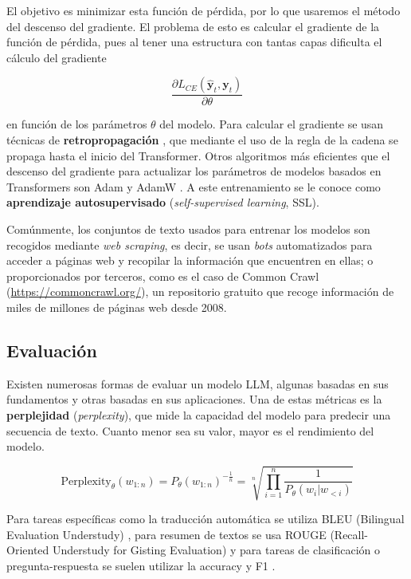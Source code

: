 \documentclass[12pt,twoside]{article}
\begin{document}
El objetivo es minimizar esta función de pérdida, por lo que usaremos el método del descenso del gradiente. El problema de esto es calcular el gradiente de la función de pérdida, pues al tener una estructura con tantas capas dificulta el cálculo del gradiente

\begin{equation}
    \frac{\partial L_{CE}(\hat{\mathbf{y}}_t,\mathbf{y}_t)}{\partial \theta}
\end{equation}

en función de los parámetros $\theta$ del modelo. Para calcular el gradiente se usan técnicas de \textbf{retropropagación} \cite{retropropagación}, que mediante el uso de la regla de la cadena se propaga hasta el inicio del Transformer. Otros algoritmos más eficientes que el descenso del gradiente para actualizar los parámetros de modelos basados en Transformers son Adam \cite{Adam} y AdamW \cite{AdamW}. A este entrenamiento se le conoce como \textbf{aprendizaje autosupervisado} (\textit{self-supervised learning}, SSL).

Comúnmente, los conjuntos de texto usados para entrenar los modelos son recogidos mediante \textit{web scraping}, es decir, se usan \textit{bots} automatizados para acceder a páginas web y recopilar la información que encuentren en ellas; o proporcionados por terceros, como es el caso de Common Crawl (\url{https://commoncrawl.org/}), un repositorio gratuito que recoge información de miles de millones de páginas web desde 2008.

\subsection{Evaluación}
Existen numerosas formas de evaluar un modelo LLM, algunas basadas en sus fundamentos y otras basadas en sus aplicaciones. Una de estas métricas es la \textbf{perplejidad} (\textit{perplexity}), que mide la capacidad del modelo para predecir una secuencia de texto. Cuanto menor sea su valor, mayor es el rendimiento del modelo.

\begin{equation}
    \text{Perplexity}_\theta(w_{1:n})=P_\theta(w_{1:n})^{-\frac{1}{n}}=\sqrt[n]{\prod_{i=1}^n\frac{1}{P_\theta(w_{i}|w_{<i})}}
\end{equation}

Para tareas específicas como la traducción automática se utiliza BLEU (Bilingual Evaluation Understudy) \cite{BLEU}, para resumen de textos se usa ROUGE (Recall-Oriented Understudy for Gisting Evaluation) \cite{ROUGE} y para tareas de clasificación o pregunta-respuesta se suelen utilizar la accuracy y F1 \cite{F1}.
\end{document}
